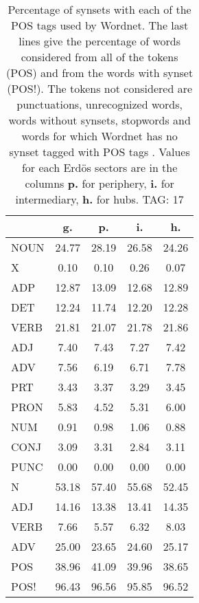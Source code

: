 \begin{table}[h!]
\begin{center}
\begin{tabular}{| l || c | c | c | c |}\hline
 & {\bf g.} & {\bf p.} & {\bf i.} & {\bf h.} \\\hline\hline
NOUN & 24.77  & 28.19  & 26.58  & 24.26 \\
X & 0.10  & 0.10  & 0.26  & 0.07 \\\hline
ADP & 12.87  & 13.09  & 12.68  & 12.89 \\
DET & 12.24  & 11.74  & 12.20  & 12.28 \\\hline
VERB & 21.81  & 21.07  & 21.78  & 21.86 \\\hline
ADJ & 7.40  & 7.43  & 7.27  & 7.42 \\
ADV & 7.56  & 6.19  & 6.71  & 7.78 \\\hline
PRT & 3.43  & 3.37  & 3.29  & 3.45 \\
PRON & 5.83  & 4.52  & 5.31  & 6.00 \\
NUM & 0.91  & 0.98  & 1.06  & 0.88 \\
CONJ & 3.09  & 3.31  & 2.84  & 3.11 \\
PUNC & 0.00  & 0.00  & 0.00  & 0.00 \\\hline\hline\hline
N & 53.18  & 57.40  & 55.68  & 52.45 \\\hline
ADJ & 14.16  & 13.38  & 13.41  & 14.35 \\\hline
VERB & 7.66  & 5.57  & 6.32  & 8.03 \\\hline
ADV & 25.00  & 23.65  & 24.60  & 25.17 \\\hline\hline
POS & 38.96  & 41.09  & 39.96  & 38.65 \\\hline
POS! & 96.43  & 96.56  & 95.85  & 96.52 \\\hline
\end{tabular}
\caption{Percentage of synsets with each of the POS tags used by Wordnet. The last lines give the percentage of words considered from all of the tokens (POS) and from the words with synset (POS!). The tokens not considered are punctuations, unrecognized words, words without synsets, stopwords and words for which Wordnet has no synset  tagged with POS tags . Values for each Erd\"os sectors are in the columns {{\bf p.}} for periphery, {{\bf i.}} for intermediary, {{\bf h.}} for hubs. TAG: 17}
\end{center}
\end{table}
